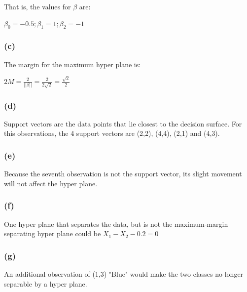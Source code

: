 \documentclass[12pt]{article}
\begin{document}
{That is, the values for $\beta$ are: 
\begin{center}
$\beta	_{0} = -0.5; \beta_{1} = 1; \beta_{2} = -1$
\end{center}

\subsubsection*{(c)}
The margin for the maximum hyper plane is: 

$2M=\frac{2}{|| \beta ||}=\frac{2}{2\sqrt{2}}=\frac{\sqrt{2}}{2}$

\subsubsection*{(d)}
Support vectors are the data points that lie closest to the decision surface. For this observations, the 4 support vectors are (2,2), (4,4), (2,1) and (4,3). 

\subsubsection*{(e)}
Because the seventh observation is not the support vector, its slight movement will not affect the hyper plane. 

\subsubsection*{(f)}
One hyper plane that separates the data, but is not the maximum-margin separating hyper plane could be $X_{1}-X_{2}-0.2 =0 $

\subsubsection*{(g)}
An additional observation of (1,3) "Blue" would make the two classes no longer separable by a hyper plane.
}
\end{document}
